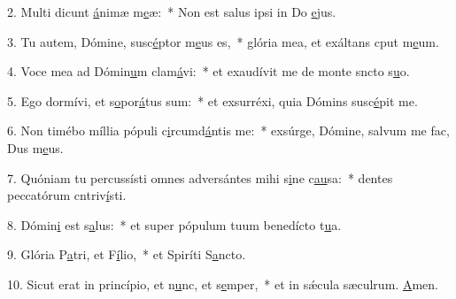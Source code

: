 2. Multi dicunt \uline{á}nimæ m\uline{e}æ:~* Non est salus ipsi in Do \uline{e}jus.\par 
3. Tu autem, Dómine, susc\uline{é}ptor m\uline{e}us es,~* glória mea, et exáltans cput m\uline{e}um.\par 
4. Voce mea ad Dómin\uline{u}m clam\uline{á}vi:~* et exaudívit me de monte sncto s\uline{u}o.\par 
5. Ego dormívi, et s\uline{o}por\uline{á}tus sum:~* et exsurréxi, quia Dómins susc\uline{é}pit me.\par 
6. Non timébo míllia pópuli c\uline{i}rcumd\uline{á}ntis me:~* exsúrge, Dómine, salvum me fac, Dus m\uline{e}us.\par 
7. Quóniam tu percussísti omnes adversántes mihi s\uline{i}ne c\uline{au}sa:~* dentes peccatórum cntriv\uline{í}sti.\par 
8. Dómin\uline{i} est s\uline{a}lus:~* et super pópulum tuum benedícto t\uline{u}a.\par 
9. Glória P\uline{a}tri, et F\uline{í}lio,~* et Spiríti S\uline{a}ncto.\par 
10. Sicut erat in princípio, et n\uline{u}nc, et s\uline{e}mper,~* et in sǽcula sæculrum. \uline{A}men.\par 
